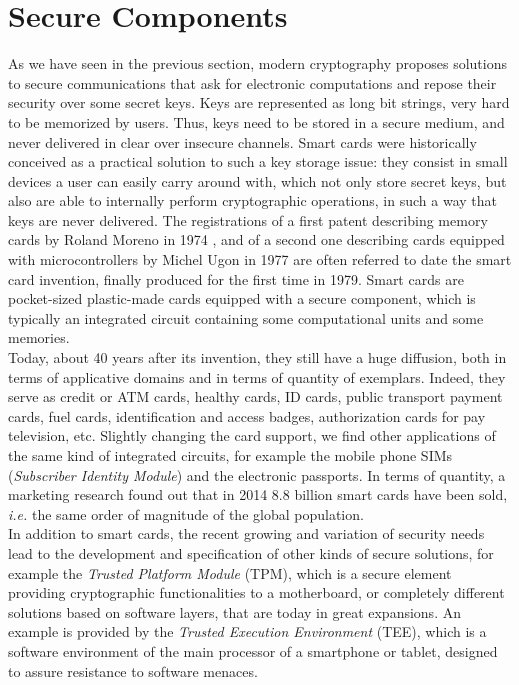 \section{Secure Components}

As we have seen in the previous section, modern cryptography proposes solutions to secure communications that ask for electronic computations and repose their security over some secret keys. Keys are represented as long bit strings, very hard to be memorized by users. Thus, keys need to be stored in a secure medium, and never delivered in clear over insecure channels. Smart cards were historically conceived as a practical solution to such a key storage issue: they consist in small devices a user can easily carry around with, which not only store secret keys, but also are able to internally perform cryptographic operations, in such a way that keys are never delivered. The registrations of a first patent describing memory cards by Roland Moreno in 1974 \cite{moreno}, and of a second one describing cards equipped with microcontrollers by Michel Ugon in 1977 \cite{ugon} are often referred to date the smart card invention, finally produced for the first time in 1979. Smart cards are pocket-sized plastic-made cards equipped with a secure component, which is typically an integrated circuit containing some computational units and some memories.\\

Today, about 40 years after its invention, they still have a huge diffusion, both in terms of applicative domains and in terms of quantity of exemplars. Indeed, they serve as credit or ATM cards, healthy cards, ID cards, public transport payment cards, fuel cards, identification and access badges, authorization cards for pay television, etc. Slightly changing the card support, we find other applications of the same kind of integrated circuits, for example the  mobile phone SIMs (\emph{Subscriber Identity Module}) and the electronic passports. In terms of quantity, a marketing research \cite{ABI} found out that in 2014 8.8 billion smart cards have been sold, \emph{i.e.} the same order of magnitude of the global population. \\

In addition to smart cards, the recent growing and variation of security needs lead to the development and specification of other kinds of secure solutions, for example the \emph{Trusted Platform Module} 
(TPM), which is a secure element providing cryptographic functionalities to a motherboard, or completely different solutions based on software layers, that are today in great expansions. An example is provided by the \emph{Trusted Execution Environment} (TEE), which is a software environment of the main processor of a smartphone or tablet, designed to assure resistance to software menaces. 

